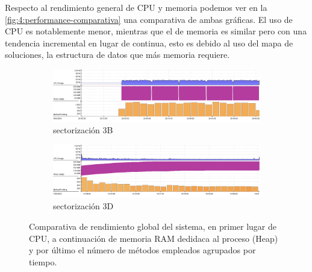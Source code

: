 
Respecto al rendimiento general de CPU y memoria podemos ver en la \autoref{fig:4:performance-comparativa} una comparativa de ambas gráficas. El uso de CPU es notablemente menor, mientras que el de memoria es similar pero con una tendencia incremental en lugar de continua, esto es debido al uso del mapa de soluciones, la estructura de datos que más memoria requiere.


\begin{figure}
	\centering
	\begin{subfigure}{\linewidth}
		\centering
		\includegraphics[width=1\linewidth]{capitulos/Capitulo4-Implementacion/recursos/Performance-legacy}
		\caption{sectorización 3B\linebreak}
		\label{fig:4:performance-legacy}
	\end{subfigure}
	
	\begin{subfigure}{\linewidth}
		\centering
		\includegraphics[width=1\linewidth]{capitulos/Capitulo4-Implementacion/recursos/Performance-system}
		\caption{sectorización 3D\linebreak}
		\label{fig:4:performance-system}
	\end{subfigure}
	
	\caption[Comparativa de rendimiento global del sistema]{Comparativa de rendimiento global del sistema, en primer lugar de CPU, a continuación de memoria RAM dedidaca al proceso (Heap) y por último el número de métodos empleados agrupados por tiempo.}
	\label{fig:4:performance-comparativa}
\end{figure}



